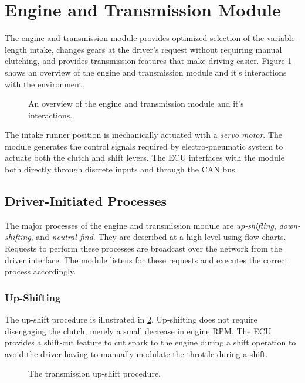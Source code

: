 \section{Engine and Transmission Module}

The engine and transmission module provides optimized selection of the variable-length intake, changes gears at the driver's request without requiring manual clutching, and provides transmission features that make driving easier. Figure \ref{fig:design_engine_overview_block} shows an overview of the engine and transmission module and it's interactions with the environment.

\begin{figure}[H]
	\centering
 	
	\caption{An overview of the engine and transmission module and it's interactions.}
	\label{fig:design_engine_overview_block}
\end{figure}

The intake runner position is mechanically actuated with a \emph{servo motor}. The module generates the control signals required by electro-pneumatic system to actuate both the clutch and shift levers. The ECU interfaces with the module both directly through discrete inputs and through the CAN bus.

\subsection{Driver-Initiated Processes}

The major processes of the engine and transmission module are \emph{up-shifting}, \emph{down-shifting}, and \emph{neutral find}. They are described at a high level using flow charts. Requests to perform these processes are broadcast over the network from the driver interface. The module listens for these requests and executes the correct process accordingly.

\subsubsection{Up-Shifting}

The up-shift procedure is illustrated in \ref{fig:transmission_upshift_flow}. Up-shifting does not require disengaging the clutch, merely a small decrease in engine RPM. The ECU provides a shift-cut feature to cut spark to the engine during a shift operation to avoid the driver having to manually modulate the throttle during a shift.

\begin{figure}[H]
	\centering
	
	\caption{The transmission up-shift procedure.}
	\label{fig:transmission_upshift_flow}
\end{figure}

